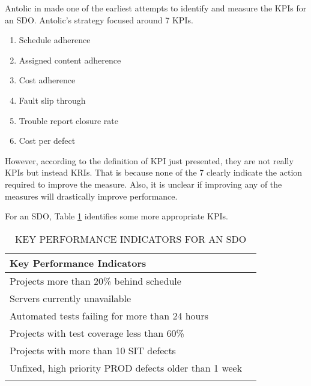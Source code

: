 \documentclass[SDSUThesis.tex]{subfiles}
\begin{document}
            Antolic in \cite{Antolic2008} made one of the earliest attempts
            to identify and measure the KPIs for an SDO. Antolic's strategy
            focused around 7 KPIs.
            \begin{enumerate}
                \item Schedule adherence
                \item Assigned content adherence
                \item Cost adherence
                \item Fault slip through
                \item Trouble report closure rate
                \item Cost per defect
            \end{enumerate}
            However, according to the definition of KPI just presented,
            they are not really KPIs but instead KRIs.  That is because
            none of the 7 clearly indicate the action required to 
            improve the measure.  Also, it is unclear if improving any of
            the measures will drastically improve performance.
            
            For an SDO, Table \ref{tab:KPI} identifies some more appropriate
            KPIs.  
            
            \begin{longtable}{@{}l l}
                \toprule%
                 \centering%
                 {\bfseries Key Performance Indicators} &
                 \\
                
                \cmidrule[0.4pt](r{0.125em}){1-1}%
                \endhead
                
                Projects more than 20\% behind schedule \\
                \myrowcolour%
                Servers currently unavailable \\
                Automated tests failing for more than 24 hours \\
                \myrowcolour%
                Projects with test coverage less than 60\% \\
                Projects with more than 10 SIT defects \\
                \myrowcolour%
                Unfixed, high priority PROD defects older than 1 week  \\
                
                \bottomrule
                
                \caption{KEY PERFORMANCE INDICATORS FOR AN SDO}
                \label{tab:KPI}
            \end{longtable}
    
\end{document}
